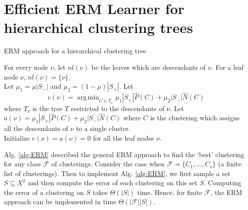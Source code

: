 \documentclass[12pt]{article}
\newcommand{\mc}{\mathcal}
\DeclareMathOperator*{\argmin}{arg\,min}
\begin{document}
\section{Efficient ERM Learner for hierarchical clustering trees}
\label{section:efficientERM}
\begin{algorithm}
\caption{ERM approach for a hierarchical clustering tree}
\label{alg:ERMTrees}
\Indp{}

\vspace{0.1in} For every node $\nu$, let $nl(\nu)$ be the leaves which are descendants of $\nu$. For a leaf node $\nu$, $nl(\nu) = \{\nu\}$. \\
Let $\mu_1 = \mu|S_-|$ and $\mu_2 = (1-\mu)|S_+|$. Let $$e(\nu) = \argmin_{C \in T_{\nu}} \mu_1|S_+|\hat P(C) + \mu_2|S_-|\hat N(C)$$ where $T_{\nu}$ is the tree $T$ restricted to the descendants of $\nu$. Let $a(\nu) = \mu_1|S_+|\hat P(C) + \mu_2|S_-|\hat N(C)$ where $C$ is the clustering which assigns all the descendants of $\nu$ to a single cluster. \\
Initialize $e(\nu) = a(\nu) = 0$ for all the leaf nodes $\nu$. \\
\end{algorithm}

Alg. \ref{alg:ERM} described the general ERM approach to find the `best' clustering for any class $\mc F$ of clusterings. Consider the case when $\mc F = \{C_1, \ldots, C_s\}$ (a finite list of clusterings). Then to implement Alg. \ref{alg:ERM}, we first sample a set $S \subseteq X^2$ and then compute the error of each clustering on this set $S$. Computing the error of a clustering on $S$ takes $\Theta(|S|)$ time. Hence, for finite $\mc F$, the ERM approach can be implemented in time $\Theta(|\mc F| |S|)$. 
\end{document}
